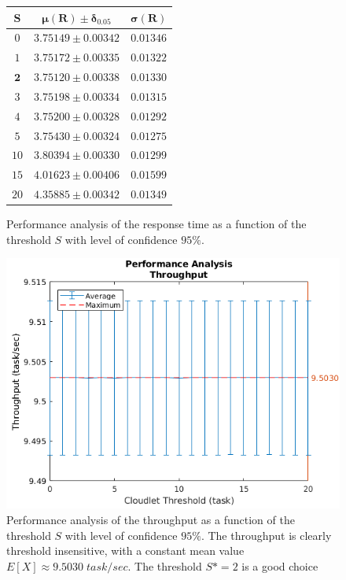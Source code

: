 \begin{figure}
	\begin{center}
	\begin{tabular}{|c||c|c|}
		\hline
		$\mathbf{S}$ & $\mathbf{\mu(R)\pm\delta_{0.05}}$ & $\mathbf{\sigma(R)}$\\
		\hline
		$0$  & $3.75149\pm 0.00342$ & $0.01346$ \\
		$1$  & $3.75172\pm 0.00335$ & $0.01322$ \\
		$\mathbf{2}$  & $\mathbf{3.75120\pm 0.00338}$ & $\mathbf{0.01330}$ \\
		$3$  & $3.75198\pm 0.00334$ & $0.01315$ \\
		$4$  & $3.75200\pm 0.00328$ & $0.01292$ \\
		$5$  & $3.75430\pm 0.00324$ & $0.01275$ \\
		$10$ & $3.80394\pm 0.00330$ & $0.01299$ \\
		$15$ & $4.01623\pm 0.00406$ & $0.01599$ \\
		$20$ & $4.35885\pm 0.00342$ & $0.01349$ \\
		\hline
	\end{tabular}
	\end{center}
	\caption{Performance analysis of the response time as a function of the threshold $S$ with level of confidence $95\%$.}
	\label{tbl:evaluation-performance-analysis-response-time}
\end{figure}

\begin{figure}
	\includegraphics[width=\columnwidth]{fig/evaluation-performance-analysis-throughput}
	\caption{Performance analysis of the throughput as a function of the threshold $S$  with level of confidence $95\%$. The throughput is clearly threshold insensitive, with a constant mean value $E[X]\approx9.5030 \; task/sec$. The threshold $S*=2$ is a good choice}
	\label{fig:evaluation-performance-analysis-throughput}
\end{figure}

